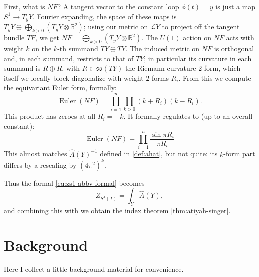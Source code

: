 \documentclass[12pt,letterpaper,reqno]{article}
\numberwithin{equation}{section}
\newcommand{\fso}{{\mathfrak {so}}}
\newcommand{\cL}{\ensuremath{\mathcal L}}
\newcommand{\R}{\ensuremath{\mathbb R}}
\DeclareMathOperator{\Euler}{Euler}
\newcommand{\fixme}[1]{{\color{orange}{[#1]}}}
\begin{document}
First, what is $NF$?
A tangent vector to the constant loop $\phi(t) = y$
is just a map $S^1 \to T_y Y$. 
Fourier expanding, the space of these maps is
$T_y Y \oplus \bigoplus_{k > 0} (T_y Y \otimes \R^2)$; using our metric
on $\cL Y$ to project off the tangent bundle $TF$, 
we get $NF = \bigoplus_{k > 0} (T_y Y \otimes \R^2)$.
The $U(1)$ action on $NF$ acts with weight $k$ 
on the $k$-th summand $TY \oplus TY$.
The induced metric on $NF$ is orthogonal and, in each summand,
restricts to that of $TY$; in particular its curvature in each summand
is $R \oplus R$, with $R \in \fso(TY)$ the Riemann curvature $2$-form,
which itself we locally block-diagonalize with weight $2$-forms $R_i$.
From this we compute the equivariant Euler form, formally:
\begin{equation}
  \Euler(NF) = \prod_{i=1}^n \prod_{k > 0} (k + R_i) (k - R_i).
\end{equation}
This product has zeroes at all $R_i = \pm k$. It formally 
regulates to (up to an overall constant):
\begin{equation}
  \Euler(NF) = \prod_{i=1}^n \frac{\sin \pi R_i}{\pi R_i}
\end{equation}
This almost matches $\hat A(Y)^{-1}$ defined in \autoref{def:ahat}, 
but not quite: its $k$-form part 
differs by a rescaling by $(4 \pi^2)^k$.
\fixme{but up to a constant we're OK; can we fix the constant?}

Thus the formal \eqref{eq:zs1-abbv-formal} becomes
\begin{equation}
  Z_{S^1(T)} = \int_Y \hat A(Y),
\end{equation}
and combining this with \fixme{...}
we obtain the index theorem \autoref{thm:atiyah-singer}.


\fixme{twisted case: couple the SUSY QM to another bundle $E$,
then get $\omega = F$}

\fixme{this gives Gauss-Bonnet if $E = S$, or signature theorem}

\fixme{refs: Witten, Alvarez-Gaume, Friedan-Windey for twisted case}

\fixme{next try going to 2-d sigma model: loop space of loop space!}

\appendix

\section{Background}

Here I collect a little background material for convenience.
\end{document}
